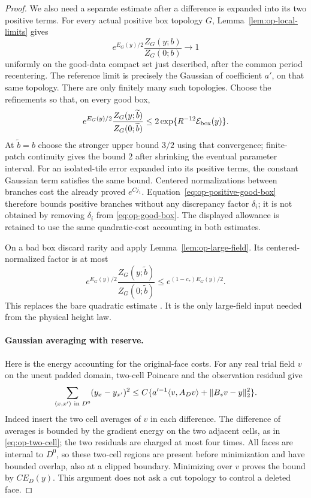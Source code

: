\begin{proof}
We also need a separate estimate after a difference is expanded
into its two positive terms.  For every actual positive box
topology \(G\), Lemma~\ref{lem:op-local-limits} gives
\[
 e^{E_G(y)/2}\frac{Z_G(y;b)}{Z_G(0;b)}\longrightarrow1
\]
uniformly on the good-data compact set just described, after
the common period recentering.  The reference limit is precisely
the Gaussian of coefficient \(a'\), on that same topology.
There are only finitely many such topologies.  Choose the
refinements so that, on every good box,
\begin{equation}\label{eq:op-positive-good-box}
 e^{E_G(y)/2}\frac{Z_G(y;\widetilde b)}{Z_G(0;\widetilde b)}
       \leq 2\exp\{R^{-12}{\cal E}_{\rm box}(y)\}.
\end{equation}
At \(\widetilde b=b\) choose the stronger upper bound \(3/2\)
using that convergence; finite-patch continuity gives the bound \(2\)
after shrinking the eventual parameter interval.  For an
isolated-tile error expanded into its positive terms, the
constant Gaussian term satisfies the same bound.  Centered
normalizations between branches cost the already proved
\(e^{Cj_1}\).  Equation~\eqref{eq:op-positive-good-box}
therefore bounds positive branches without any discrepancy
factor \(\delta_i\); it is not obtained by removing
\(\delta_i\) from \eqref{eq:op-good-box}.  The displayed
allowance is retained to use the same quadratic-cost accounting
in both estimates.

On a bad box discard rarity and apply
Lemma~\ref{lem:op-large-field}.  Its centered-normalized
factor is at most
\[
 e^{E_G(y)/2}\frac{Z_G(y;\widetilde b)}{Z_G(0;\widetilde b)}
                     \leq e^{(1-c_*)E_G(y)/2}.
\]
This replaces the bare quadratic estimate
.  It is the only large-field input
needed from the physical height law.

\paragraph{Gaussian averaging with reserve.}
Here is the energy accounting for the original-face costs.
For any real trial field \(v\) on the uncut padded domain,
two-cell Poincare and the observation residual give
\begin{equation}\label{eq:op-original-face-control}
 \sum_{\langle x,x'\rangle\text{ in }D^0}(y_x-y_{x'})^2
 \leq C\{a'^{-1}\langle v,A_Dv\rangle+\lVert B_sv-y\rVert_2^2\}.
\end{equation}
Indeed insert the two cell averages of \(v\) in each
difference.  The difference of averages is bounded by the
gradient energy on the two adjacent cells, as in
\eqref{eq:op-two-cell}; the two residuals are charged at
most four times.  All faces are internal to \(D^0\), so
these two-cell regions are present before minimization and
have bounded overlap, also at a clipped boundary.  Minimizing
over \(v\) proves the bound by \(CE_D(y)\).  This argument
does not ask a cut topology to control a deleted face.


\end{proof}
